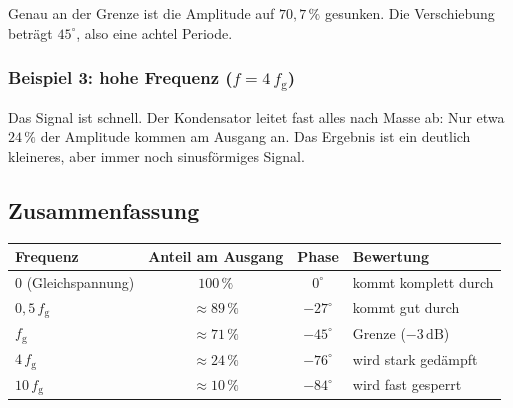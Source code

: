 \documentclass[a4paper,12pt,twoside]{report}
\theoremstyle{definition}
\begin{document}
Genau an der Grenze ist die Amplitude auf $70{,}7\,\%$ gesunken. Die
Verschiebung beträgt $45^\circ$, also eine achtel Periode.

\subsubsection*{Beispiel 3: hohe Frequenz ($f = 4\,f_\mathrm{g}$)}

\begin{center}
\end{center}

Das Signal ist schnell. Der Kondensator leitet fast alles nach Masse ab:
Nur etwa $24\,\%$ der Amplitude kommen am Ausgang an. Das Ergebnis
ist ein deutlich kleineres, aber immer noch sinusförmiges Signal.

\subsection*{Zusammenfassung}

\begin{center}
\renewcommand{\arraystretch}{1.3}
\begin{tabular}{|l|c|c|l|}
  \hline
  \textbf{Frequenz} & \textbf{Anteil am Ausgang} & \textbf{Phase} & \textbf{Bewertung} \\
  \hline
  $0$ (Gleichspannung)      & $100\,\%$   & $0^\circ$   & kommt komplett durch \\
  $0{,}5\,f_\mathrm{g}$     & $\approx 89\,\%$ & $-27^\circ$ & kommt gut durch \\
  $f_\mathrm{g}$            & $\approx 71\,\%$ & $-45^\circ$ & Grenze ($-3\,\mathrm{dB}$) \\
  $4\,f_\mathrm{g}$         & $\approx 24\,\%$ & $-76^\circ$ & wird stark gedämpft \\
  $10\,f_\mathrm{g}$        & $\approx 10\,\%$ & $-84^\circ$ & wird fast gesperrt \\
  \hline
\end{tabular}
\end{center}

\begin{center}
\end{center}
\end{document}
